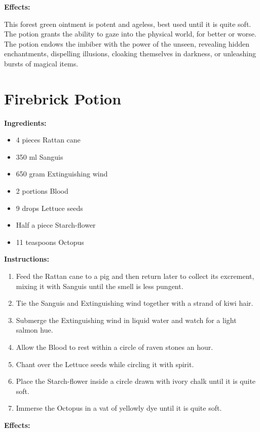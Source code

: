 \documentclass{article}
\begin{document}
\textbf{Effects:}

This forest green ointment is potent and ageless, best used until it is quite soft. The potion grants the ability to gaze into the physical world, for better or worse. The potion endows the imbiber with the power of the unseen, revealing hidden enchantments, dispelling illusions, cloaking themselves in darkness, or unleashing bursts of magical items.

\newpage
\section*{Firebrick Potion}

\textbf{Ingredients:}

\begin{itemize}
  \item 4 pieces Rattan cane
  \item 350 ml Sanguis
  \item 650 gram Extinguishing wind
  \item 2 portions Blood
  \item 9 drops Lettuce seeds
  \item Half a piece Starch-flower
  \item 11 teaspoons Octopus
\end{itemize}

\textbf{Instructions:}

\begin{enumerate}
  \item Feed the Rattan cane to a pig and then return later to collect its excrement, mixing it with Sanguis until the smell is less pungent.
  \item Tie the Sanguis and Extinguishing wind together with a strand of kiwi hair.
  \item Submerge the Extinguishing wind in liquid water and watch for a light salmon hue.
  \item Allow the Blood to rest within a circle of raven stones an hour.
  \item Chant over the Lettuce seeds while circling it with spirit.
  \item Place the Starch-flower inside a circle drawn with ivory chalk until it is quite soft.
  \item Immerse the Octopus in a vat of yellowly dye until it is quite soft.
\end{enumerate}

\textbf{Effects:}
\end{document}
